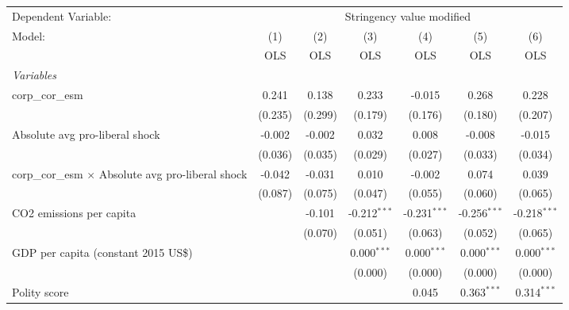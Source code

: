 
\begingroup
\centering
\begin{tabular}{lcccccc}
   \toprule
   Dependent Variable: & \multicolumn{6}{c}{Stringency value modified}\\
   Model:                                                    & (1)     & (2)     & (3)            & (4)            & (5)            & (6)\\  
                                                             &  OLS    & OLS     & OLS            & OLS            & OLS            & OLS\\  
   \midrule
   \emph{Variables}\\
   corp\_cor\_esm                                            & 0.241   & 0.138   & 0.233          & -0.015         & 0.268          & 0.228\\   
                                                             & (0.235) & (0.299) & (0.179)        & (0.176)        & (0.180)        & (0.207)\\   
   Absolute avg pro-liberal shock                            & -0.002  & -0.002  & 0.032          & 0.008          & -0.008         & -0.015\\   
                                                             & (0.036) & (0.035) & (0.029)        & (0.027)        & (0.033)        & (0.034)\\   
   corp\_cor\_esm $\times$ Absolute avg pro-liberal shock    & -0.042  & -0.031  & 0.010          & -0.002         & 0.074          & 0.039\\   
                                                             & (0.087) & (0.075) & (0.047)        & (0.055)        & (0.060)        & (0.065)\\   
   CO2 emissions per capita                                  &         & -0.101  & -0.212$^{***}$ & -0.231$^{***}$ & -0.256$^{***}$ & -0.218$^{***}$\\   
                                                             &         & (0.070) & (0.051)        & (0.063)        & (0.052)        & (0.065)\\   
   GDP per capita (constant 2015 US\$)                       &         &         & 0.000$^{***}$  & 0.000$^{***}$  & 0.000$^{***}$  & 0.000$^{***}$\\   
                                                             &         &         & (0.000)        & (0.000)        & (0.000)        & (0.000)\\   
   Polity score                                              &         &         &                & 0.045          & 0.363$^{***}$  & 0.314$^{***}$\\   

\end{tabular}
